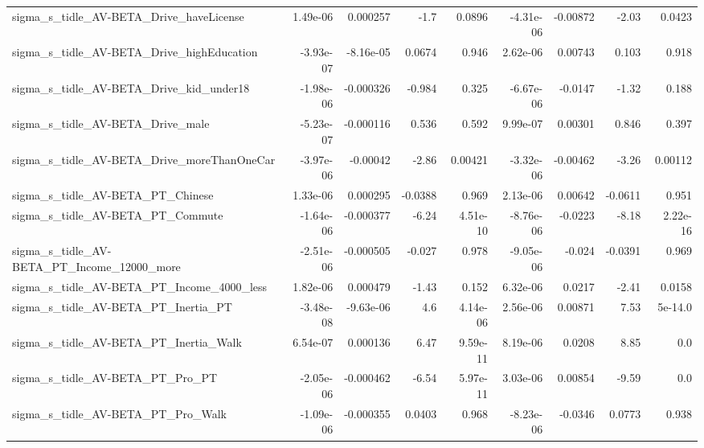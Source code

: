 \begin{tabular}{lrrrrrrrr}
sigma\_s\_tidle\_AV-BETA\_Drive\_haveLicense            &    1.49e-06 &     0.000257 &     -1.7 &   0.0896 &  -4.31e-06 &    -0.00872 &        -2.03 &        0.0423 \\
sigma\_s\_tidle\_AV-BETA\_Drive\_highEducation          &   -3.93e-07 &    -8.16e-05 &   0.0674 &    0.946 &   2.62e-06 &     0.00743 &        0.103 &         0.918 \\
sigma\_s\_tidle\_AV-BETA\_Drive\_kid\_under18            &   -1.98e-06 &    -0.000326 &   -0.984 &    0.325 &  -6.67e-06 &     -0.0147 &        -1.32 &         0.188 \\
sigma\_s\_tidle\_AV-BETA\_Drive\_male                   &   -5.23e-07 &    -0.000116 &    0.536 &    0.592 &   9.99e-07 &     0.00301 &        0.846 &         0.397 \\
sigma\_s\_tidle\_AV-BETA\_Drive\_moreThanOneCar         &   -3.97e-06 &     -0.00042 &    -2.86 &  0.00421 &  -3.32e-06 &    -0.00462 &        -3.26 &       0.00112 \\
sigma\_s\_tidle\_AV-BETA\_PT\_Chinese                   &    1.33e-06 &     0.000295 &  -0.0388 &    0.969 &   2.13e-06 &     0.00642 &      -0.0611 &         0.951 \\
sigma\_s\_tidle\_AV-BETA\_PT\_Commute                   &   -1.64e-06 &    -0.000377 &    -6.24 & 4.51e-10 &  -8.76e-06 &     -0.0223 &        -8.18 &      2.22e-16 \\
sigma\_s\_tidle\_AV-BETA\_PT\_Income\_12000\_more         &   -2.51e-06 &    -0.000505 &   -0.027 &    0.978 &  -9.05e-06 &      -0.024 &      -0.0391 &         0.969 \\
sigma\_s\_tidle\_AV-BETA\_PT\_Income\_4000\_less          &    1.82e-06 &     0.000479 &    -1.43 &    0.152 &   6.32e-06 &      0.0217 &        -2.41 &        0.0158 \\
sigma\_s\_tidle\_AV-BETA\_PT\_Inertia\_PT                &   -3.48e-08 &    -9.63e-06 &      4.6 & 4.14e-06 &   2.56e-06 &     0.00871 &         7.53 &       5e-14.0 \\
sigma\_s\_tidle\_AV-BETA\_PT\_Inertia\_Walk              &    6.54e-07 &     0.000136 &     6.47 & 9.59e-11 &   8.19e-06 &      0.0208 &         8.85 &           0.0 \\
sigma\_s\_tidle\_AV-BETA\_PT\_Pro\_PT                    &   -2.05e-06 &    -0.000462 &    -6.54 & 5.97e-11 &   3.03e-06 &     0.00854 &        -9.59 &           0.0 \\
sigma\_s\_tidle\_AV-BETA\_PT\_Pro\_Walk                  &   -1.09e-06 &    -0.000355 &   0.0403 &    0.968 &  -8.23e-06 &     -0.0346 &       0.0773 &         0.938 \\

\end{tabular}

